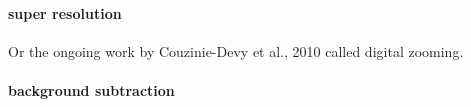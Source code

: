 \paragraph{super resolution} \cite{Yang2010} \cite{Wright2008}  
Or the ongoing work by Couzinie-Devy et al., 2010 called digital zooming.
\paragraph{background subtraction} \cite{}








